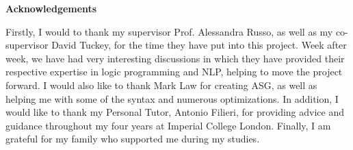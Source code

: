 \newenvironment{acknowledgements}
    {\thispagestyle{plain}\null\vfill\begin{center}
    \bfseries Acknowledgements\end{center}}
    {\vfill\null}
        \begin{acknowledgements}
        Firstly, I would to thank my supervisor Prof. Alessandra Russo, as well as my co-supervisor David Tuckey, for the time they have put into this project. Week after week, we have had very interesting discussions in which they have provided their respective expertise in logic programming and NLP, helping to move the project forward. I would also like to thank Mark Law for creating ASG, as well as helping me with some of the syntax and numerous optimizations. In addition, I would like to thank my Personal Tutor, Antonio Filieri, for providing advice and guidance throughout my four years at Imperial College London. Finally, I am grateful for my family who supported me during my studies.
        \end{acknowledgements}